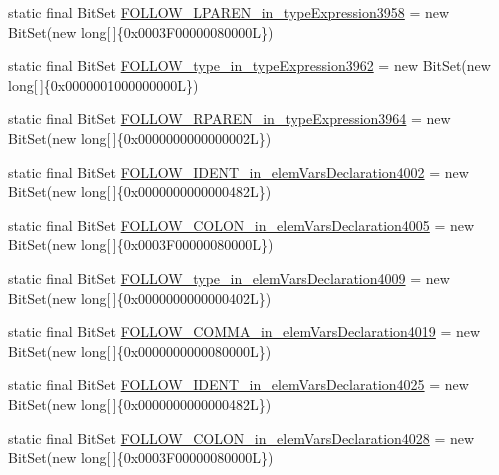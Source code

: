 \begin{DoxyCompactItemize}
static final Bit\-Set \hyperlink{classorg_1_1tzi_1_1use_1_1parser_1_1soil_1_1_soil_parser_a7957e0dc97adfd6785dad8c2a8bfcc51}{F\-O\-L\-L\-O\-W\-\_\-\-L\-P\-A\-R\-E\-N\-\_\-in\-\_\-type\-Expression3958} = new Bit\-Set(new long\mbox{[}$\,$\mbox{]}\{0x0003\-F00000080000\-L\})
\item 
static final Bit\-Set \hyperlink{classorg_1_1tzi_1_1use_1_1parser_1_1soil_1_1_soil_parser_a5b39b18bf4fe6bd25def2332b005d000}{F\-O\-L\-L\-O\-W\-\_\-type\-\_\-in\-\_\-type\-Expression3962} = new Bit\-Set(new long\mbox{[}$\,$\mbox{]}\{0x0000001000000000\-L\})
\item 
static final Bit\-Set \hyperlink{classorg_1_1tzi_1_1use_1_1parser_1_1soil_1_1_soil_parser_a1b8d6ca85aaf032cee6c783548282f54}{F\-O\-L\-L\-O\-W\-\_\-\-R\-P\-A\-R\-E\-N\-\_\-in\-\_\-type\-Expression3964} = new Bit\-Set(new long\mbox{[}$\,$\mbox{]}\{0x0000000000000002\-L\})
\item 
static final Bit\-Set \hyperlink{classorg_1_1tzi_1_1use_1_1parser_1_1soil_1_1_soil_parser_ab86683dc5e7663b4468e29de7bbfd336}{F\-O\-L\-L\-O\-W\-\_\-\-I\-D\-E\-N\-T\-\_\-in\-\_\-elem\-Vars\-Declaration4002} = new Bit\-Set(new long\mbox{[}$\,$\mbox{]}\{0x0000000000000482\-L\})
\item 
static final Bit\-Set \hyperlink{classorg_1_1tzi_1_1use_1_1parser_1_1soil_1_1_soil_parser_a560bf109b030223e6f6b4e93a529a318}{F\-O\-L\-L\-O\-W\-\_\-\-C\-O\-L\-O\-N\-\_\-in\-\_\-elem\-Vars\-Declaration4005} = new Bit\-Set(new long\mbox{[}$\,$\mbox{]}\{0x0003\-F00000080000\-L\})
\item 
static final Bit\-Set \hyperlink{classorg_1_1tzi_1_1use_1_1parser_1_1soil_1_1_soil_parser_ab31a5b20aeab38e29cdc26e8ebde37a6}{F\-O\-L\-L\-O\-W\-\_\-type\-\_\-in\-\_\-elem\-Vars\-Declaration4009} = new Bit\-Set(new long\mbox{[}$\,$\mbox{]}\{0x0000000000000402\-L\})
\item 
static final Bit\-Set \hyperlink{classorg_1_1tzi_1_1use_1_1parser_1_1soil_1_1_soil_parser_a2364ccce5d131c26b15afe4bf6809922}{F\-O\-L\-L\-O\-W\-\_\-\-C\-O\-M\-M\-A\-\_\-in\-\_\-elem\-Vars\-Declaration4019} = new Bit\-Set(new long\mbox{[}$\,$\mbox{]}\{0x0000000000080000\-L\})
\item 
static final Bit\-Set \hyperlink{classorg_1_1tzi_1_1use_1_1parser_1_1soil_1_1_soil_parser_a3a7fe82e24d7625554643349cac47e43}{F\-O\-L\-L\-O\-W\-\_\-\-I\-D\-E\-N\-T\-\_\-in\-\_\-elem\-Vars\-Declaration4025} = new Bit\-Set(new long\mbox{[}$\,$\mbox{]}\{0x0000000000000482\-L\})
\item 
static final Bit\-Set \hyperlink{classorg_1_1tzi_1_1use_1_1parser_1_1soil_1_1_soil_parser_ab46a1fb7172c511f8fc09aa7e00fe8bb}{F\-O\-L\-L\-O\-W\-\_\-\-C\-O\-L\-O\-N\-\_\-in\-\_\-elem\-Vars\-Declaration4028} = new Bit\-Set(new long\mbox{[}$\,$\mbox{]}\{0x0003\-F00000080000\-L\})

\end{DoxyCompactItemize}

